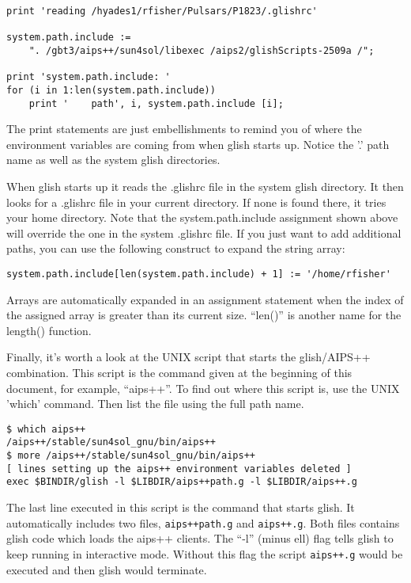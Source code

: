 \begin{verbatim}
print 'reading /hyades1/rfisher/Pulsars/P1823/.glishrc'
 
system.path.include := 
    ". /gbt3/aips++/sun4sol/libexec /aips2/glishScripts-2509a /";
 
print 'system.path.include: '
for (i in 1:len(system.path.include))
    print '    path', i, system.path.include [i];
\end{verbatim}

The print statements are just embellishments to remind you of where the
environment variables are coming from when glish starts up.  Notice the '.'
path name as well as the system glish directories.

    When glish starts up it reads the .glishrc file in the system glish
directory.  It then looks for a .glishrc file in your current directory.
If none is found there, it tries your home directory.  Note that the
system.path.include assignment shown above will override the one in the
system .glishrc file.  If you just want to add additional paths, you can
use the following construct to expand the string array:

\begin{verbatim}
system.path.include[len(system.path.include) + 1] := '/home/rfisher'
\end{verbatim}

Arrays are automatically expanded in an assignment statement when the
index of the assigned array is greater than its current size.  ``len()'' is
another name for the length() function.

    Finally, it's worth a look at the UNIX script that starts the
glish/AIPS++ combination.  This script is the command given at the
beginning of this document, for example, ``aips++''.  To find out where this
script is, use the UNIX 'which' command.  Then list the file using the full
path name.

\begin{verbatim}
$ which aips++
/aips++/stable/sun4sol_gnu/bin/aips++
$ more /aips++/stable/sun4sol_gnu/bin/aips++
[ lines setting up the aips++ environment variables deleted ]
exec $BINDIR/glish -l $LIBDIR/aips++path.g -l $LIBDIR/aips++.g
\end{verbatim}

The last line executed in this script is the command that starts 
glish.  It automatically includes two files, \verb!aips++path.g! and
\verb!aips++.g!.
Both files contains glish
code which loads the aips++ clients.  The ``-l'' (minus ell) flag tells glish
to keep running in interactive mode.  Without this flag the script \verb!aips++.g!
would be executed and then glish would terminate.

